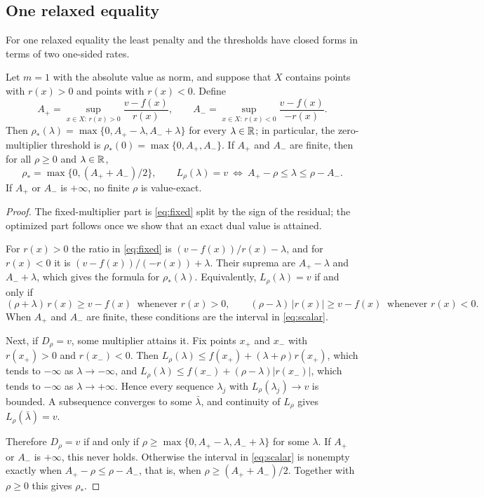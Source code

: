 \subsection{One relaxed equality}
For one relaxed equality the least penalty and the thresholds have
closed forms in terms of two one-sided rates.

\begin{proposition}\label{prop:scalar}
Let $m=1$ with the absolute value as norm, and suppose that $X$ contains
points with $r(x)>0$ and points with $r(x)<0$. Define
\[
 A_+=\sup_{x\in X:\,r(x)>0}\frac{v-f(x)}{r(x)},\qquad
 A_-=\sup_{x\in X:\,r(x)<0}\frac{v-f(x)}{-r(x)}.
\]
Then $\rho_*(\lambda)=\max\{0,A_+-\lambda,A_-+\lambda\}$ for every
$\lambda\in\mathbb R$; in particular, the zero-multiplier threshold is
$\rho_*(0)=\max\{0,A_+,A_-\}$. If $A_+$ and $A_-$ are finite, then for
all $\rho\ge0$ and $\lambda\in\mathbb R$,
\begin{equation}\label{eq:scalar}
 \rho_*=\max\{0,(A_++A_-)/2\},\qquad
 L_\rho(\lambda)=v\ \Longleftrightarrow\
 A_+-\rho\le\lambda\le\rho-A_-.
\end{equation}
If $A_+$ or $A_-$ is $+\infty$, no finite $\rho$ is value-exact.
\end{proposition}
\begin{proof}
The fixed-multiplier part is \eqref{eq:fixed} split by the sign of the
residual; the optimized part follows once we show that an exact dual
value is attained.

For $r(x)>0$ the ratio in \eqref{eq:fixed} is $(v-f(x))/r(x)-\lambda$,
and for $r(x)<0$ it is $(v-f(x))/(-r(x))+\lambda$. Their suprema are
$A_+-\lambda$ and $A_-+\lambda$, which gives the formula for
$\rho_*(\lambda)$. Equivalently, $L_\rho(\lambda)=v$ if and only if
\[
 (\rho+\lambda)\,r(x)\ge v-f(x)\ \text{ whenever }r(x)>0,\qquad
 (\rho-\lambda)\,|r(x)|\ge v-f(x)\ \text{ whenever }r(x)<0.
\]
When $A_+$ and $A_-$ are finite, these conditions are the interval in
\eqref{eq:scalar}.

Next, if $D_\rho=v$, some multiplier attains it. Fix points $x_+$ and
$x_-$ with $r(x_+)>0$ and $r(x_-)<0$. Then
$L_\rho(\lambda)\le f(x_+)+(\lambda+\rho)r(x_+)$, which tends to
$-\infty$ as $\lambda\to-\infty$, and
$L_\rho(\lambda)\le f(x_-)+(\rho-\lambda)|r(x_-)|$, which tends to
$-\infty$ as $\lambda\to+\infty$. Hence every sequence $\lambda_j$ with
$L_\rho(\lambda_j)\to v$ is bounded. A subsequence converges to some
$\bar\lambda$, and continuity of $L_\rho$ gives $L_\rho(\bar\lambda)=v$.

Therefore $D_\rho=v$ if and only if
$\rho\ge\max\{0,A_+-\lambda,A_-+\lambda\}$ for some $\lambda$. If $A_+$
or $A_-$ is $+\infty$, this never holds. Otherwise the interval in
\eqref{eq:scalar} is nonempty exactly when $A_+-\rho\le\rho-A_-$, that
is, when $\rho\ge(A_++A_-)/2$. Together with $\rho\ge0$ this gives
$\rho_*$.
\end{proof}
